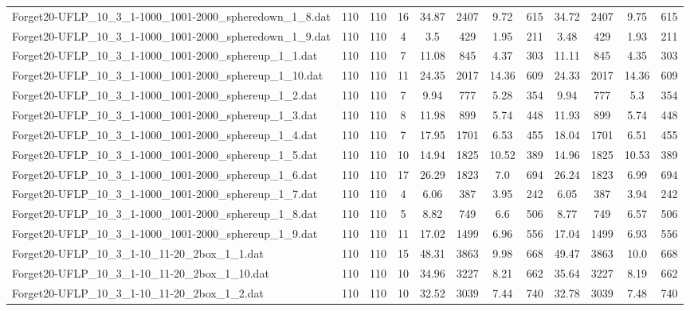 \begin{sidewaystable}[!ht]
{\begin{tabular}{lccccccccccc}
Forget20-UFLP\_10\_3\_1-1000\_1001-2000\_spheredown\_1\_8.dat & 110 & 110 & 16 & 34.87 & 2407 & 9.72 & 615 & 34.72 & 2407 & 9.75 & 615 \\
Forget20-UFLP\_10\_3\_1-1000\_1001-2000\_spheredown\_1\_9.dat & 110 & 110 & 4 & 3.5 & 429 & 1.95 & 211 & 3.48 & 429 &  \textcolor{blue2}{1.93} & 211 \\
Forget20-UFLP\_10\_3\_1-1000\_1001-2000\_sphereup\_1\_1.dat & 110 & 110 & 7 & 11.08 & 845 & 4.37 & 303 & 11.11 & 845 &  \textcolor{blue2}{4.35} & 303 \\
Forget20-UFLP\_10\_3\_1-1000\_1001-2000\_sphereup\_1\_10.dat & 110 & 110 & 11 & 24.35 & 2017 & 14.36 & 609 & 24.33 & 2017 & 14.36 & 609 \\
Forget20-UFLP\_10\_3\_1-1000\_1001-2000\_sphereup\_1\_2.dat & 110 & 110 & 7 & 9.94 & 777 &  \textcolor{blue2}{5.28} & 354 & 9.94 & 777 & 5.3 & 354 \\
Forget20-UFLP\_10\_3\_1-1000\_1001-2000\_sphereup\_1\_3.dat & 110 & 110 & 8 & 11.98 & 899 & 5.74 & 448 & 11.93 & 899 & 5.74 & 448 \\
Forget20-UFLP\_10\_3\_1-1000\_1001-2000\_sphereup\_1\_4.dat & 110 & 110 & 7 & 17.95 & 1701 & 6.53 & 455 & 18.04 & 1701 & 6.51 & 455 \\
Forget20-UFLP\_10\_3\_1-1000\_1001-2000\_sphereup\_1\_5.dat & 110 & 110 & 10 & 14.94 & 1825 &  \textcolor{blue2}{10.52} & 389 & 14.96 & 1825 & 10.53 & 389 \\
Forget20-UFLP\_10\_3\_1-1000\_1001-2000\_sphereup\_1\_6.dat & 110 & 110 & 17 & 26.29 & 1823 & 7.0 & 694 & 26.24 & 1823 &  \textcolor{blue2}{6.99} & 694 \\
Forget20-UFLP\_10\_3\_1-1000\_1001-2000\_sphereup\_1\_7.dat & 110 & 110 & 4 & 6.06 & 387 & 3.95 & 242 & 6.05 & 387 & 3.94 & 242 \\
Forget20-UFLP\_10\_3\_1-1000\_1001-2000\_sphereup\_1\_8.dat & 110 & 110 & 5 & 8.82 & 749 & 6.6 & 506 & 8.77 & 749 &  \textcolor{blue2}{6.57} & 506 \\
Forget20-UFLP\_10\_3\_1-1000\_1001-2000\_sphereup\_1\_9.dat & 110 & 110 & 11 & 17.02 & 1499 & 6.96 & 556 & 17.04 & 1499 &  \textcolor{blue2}{6.93} & 556 \\
Forget20-UFLP\_10\_3\_1-10\_11-20\_2box\_1\_1.dat & 110 & 110 & 15 & 48.31 & 3863 & 9.98 & 668 & 49.47 & 3863 & 10.0 & 668 \\
Forget20-UFLP\_10\_3\_1-10\_11-20\_2box\_1\_10.dat & 110 & 110 & 10 & 34.96 & 3227 & 8.21 & 662 & 35.64 & 3227 &  \textcolor{blue2}{8.19} & 662 \\
Forget20-UFLP\_10\_3\_1-10\_11-20\_2box\_1\_2.dat & 110 & 110 & 10 & 32.52 & 3039 &  \textcolor{blue2}{7.44} & 740 & 32.78 & 3039 & 7.48 & 740 \\

\end{tabular}}
\end{sidewaystable}
